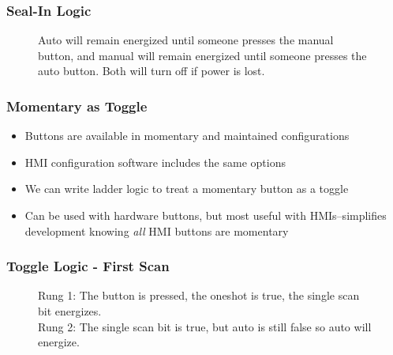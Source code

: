 \begin{frame}
    \frametitle{Seal-In Logic}

    \begin{figure}
        \centering

        \resizebox{0.75\linewidth}{!}{
            
        }

        \vspace{0.5em}
        {\footnotesize Auto will remain energized until someone presses the manual button, and manual will remain energized until someone presses the auto button. Both will turn off if power is lost.\par}
    \end{figure}
\end{frame}

\begin{frame}
    \frametitle{Momentary as Toggle}

    \begin{itemize}
        \item Buttons are available in momentary and maintained configurations
        \item HMI configuration software includes the same options
        \item We can write ladder logic to treat a momentary button as a toggle
        \item Can be used with hardware buttons, but most useful with HMIs--simplifies development knowing \emph{all} HMI buttons are momentary
    \end{itemize}
\end{frame}

\begin{frame}
    \frametitle{Toggle Logic - First Scan}

    \begin{figure}
        \centering
        
        

        \vspace{0.5em}
        {\footnotesize Rung 1: The button is pressed, the oneshot is true, the single scan bit energizes.\\ Rung 2: The single scan bit is true, but auto is still false so auto will energize. \par}
    \end{figure}
\end{frame}

